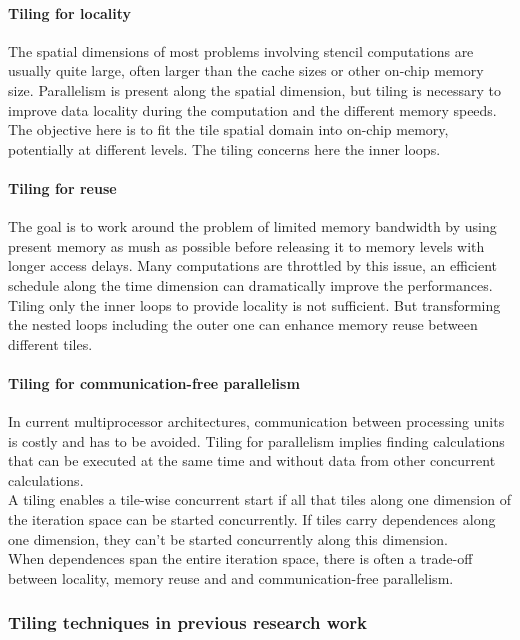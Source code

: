 \documentclass[a4paper,11pt]{article}
\begin{document}
  \paragraph{Tiling for locality} The spatial dimensions of most problems involving stencil computations 
  are usually quite large, often larger than the cache sizes or other on-chip memory
  size. Parallelism is present along the spatial dimension, but tiling is necessary to improve
  data locality during the computation and the different memory speeds.\\
  The objective here is to fit the tile spatial domain into on-chip memory, potentially at
  different levels. The tiling concerns here the inner loops.

  \paragraph{Tiling for reuse} The goal is to work around the problem of limited memory bandwidth
  by using present memory as mush as possible before releasing it to memory levels with
  longer access delays. Many computations are throttled by this issue, an efficient schedule
  along the time dimension can dramatically improve the performances. Tiling only the inner
  loops to provide locality is not sufficient. But transforming the nested loops including the
  outer one can enhance memory reuse between different tiles.
  
  \paragraph{Tiling for communication-free parallelism} In current multiprocessor architectures,
  communication between processing units is costly and has to be avoided. Tiling for parallelism 
  implies finding calculations that can be executed at the same time and without
  data from other concurrent calculations. \\
  A tiling enables a tile-wise concurrent start if all that tiles along one dimension of the iteration
  space can be started concurrently. If tiles carry dependences along one dimension,
  they can’t be started concurrently along this dimension. \\
  When dependences span the entire iteration space, there is often a trade-off between locality,
  memory reuse and and communication-free parallelism.

\subsubsection{Tiling techniques in previous research work}
\end{document}
